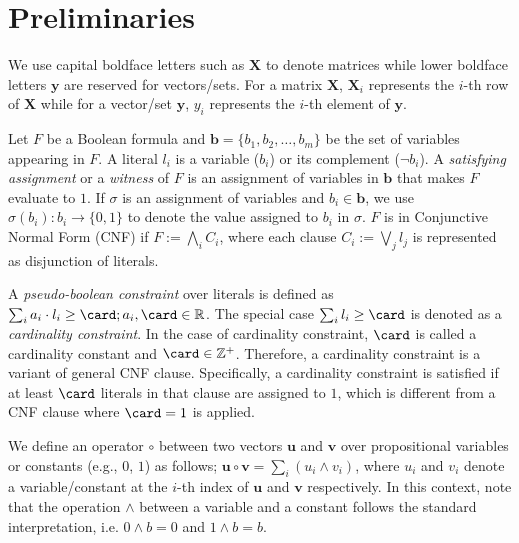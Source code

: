 \section{Preliminaries}
\label{sec:preliminaries}

 We use capital  boldface letters such as $\mathbf{X}$ to denote matrices while lower boldface letters $\mathbf{y}$ are reserved for vectors/sets. For a matrix $\mathbf{X}$, $\mathbf{X}_i$  represents the $ i $-th row of $\mathbf{X}$ while for a vector/set $\mathbf{y}$, $y_i$ represents the $ i $-th element of $\mathbf{y}$. 


Let $F$ be a Boolean formula and  $\mathbf{b} = \{b_1,b_2,\dots ,b_m \}$ be the set of variables appearing in $F$. A literal $ l_i $ is a variable ($b_i$) or its complement ($\neg b_i$).  A \emph{satisfying assignment} or a \emph{witness} of $F$ is an assignment of variables in $\mathbf{b}$ that makes $F$ evaluate to $ 1 $.  If $\sigma$ is an assignment of variables and $b_i \in \mathbf{b}$, we use $\sigma(b_i) : b_i \rightarrow \{0,1\}$ to denote the value assigned to $b_i$ in $\sigma$. $F$ is in Conjunctive Normal Form (CNF) if $F :=  \bigwedge_i C_i$, where each clause $C_i :=  \bigvee_j l_j $ is represented as disjunction of literals. 


A \emph{pseudo-boolean constraint} over literals is defined as $ \sum_i a_i\cdot l_i \ge \card; a_i,\card \in \mathbb{R} $.  The special case $ \sum_i l_i \ge \card $ is denoted as a \emph{cardinality constraint}. In the  case of cardinality constraint, $ \card $ is called a  cardinality constant and $ \card \in \mathbb{Z} ^+$. 
Therefore, a cardinality constraint is a variant of general  CNF clause. 
 Specifically,  a cardinality constraint is satisfied if at least $ \card $ literals in that clause are assigned to $ 1 $, which is different from a CNF clause where $ \card=1 $ is applied.
 
  
We define an operator $ \circ $ between  two vectors $\mathbf{u}$ and $\mathbf{v}$ over propositional variables or constants (e.g.,  $ 0 $, $ 1 $) as follows;    $\mathbf{u} \circ \mathbf{v} = \sum_{i} (u_{i} \wedge v_{i})$, where $u_{i}$ and $v_{i}$ denote a variable/constant  at the $i$-th index of $\mathbf{u}$ and $\mathbf{v}$ respectively. In this context, note that the operation $\wedge$ between a variable and a constant follows the standard interpretation, i.e. $0 \wedge b = 0$ and $1 \wedge b = b$. 



